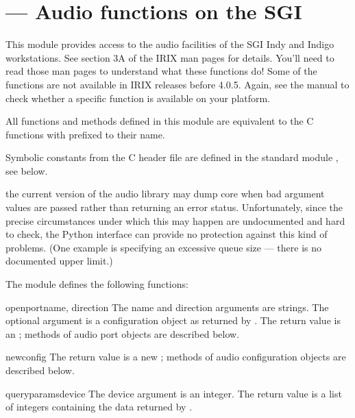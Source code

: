 \section{ ---
         Audio functions on the SGI}



This module provides access to the audio facilities of the SGI Indy
and Indigo workstations.  See section 3A of the IRIX man pages for
details.  You'll need to read those man pages to understand what these
functions do!  Some of the functions are not available in IRIX
releases before 4.0.5.  Again, see the manual to check whether a
specific function is available on your platform.

All functions and methods defined in this module are equivalent to
the C functions with  prefixed to their name.

Symbolic constants from the C header file  are
defined in the standard module
, see below.

 the current version of the audio library may dump core
when bad argument values are passed rather than returning an error
status.  Unfortunately, since the precise circumstances under which
this may happen are undocumented and hard to check, the Python
interface can provide no protection against this kind of problems.
(One example is specifying an excessive queue size --- there is no
documented upper limit.)

The module defines the following functions:


\begin{funcdesc}{openport}{name, direction}
The name and direction arguments are strings.  The optional
 argument is a configuration object as returned by
.  The return value is an ; methods of audio port objects are described below.
\end{funcdesc}

\begin{funcdesc}{newconfig}{}
The return value is a new ; methods of
audio configuration objects are described below.
\end{funcdesc}

\begin{funcdesc}{queryparams}{device}
The device argument is an integer.  The return value is a list of
integers containing the data returned by .
\end{funcdesc}

